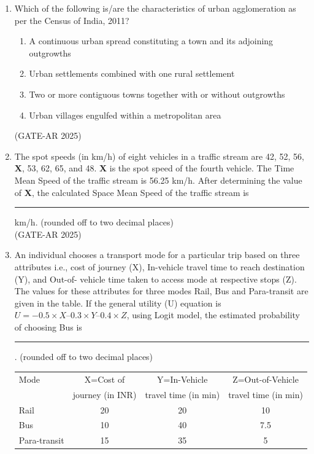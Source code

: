 \documentclass[a4paper,10pt]{article}
\begin{document}
\begin{enumerate}
\item Which of the following is/are the characteristics of urban agglomeration as per the Census of India, 2011?
\begin{enumerate}
    \item A continuous urban spread constituting a town and its adjoining outgrowths
    \item Urban settlements combined with one rural settlement
    \item Two or more contiguous towns together with or without outgrowths
    \item Urban villages engulfed within a metropolitan area
\end{enumerate}
\hfill (GATE-AR 2025)

    \item The spot speeds (in km/h) of eight vehicles in a traffic stream are 42, 52, 56, \textbf{X}, 53, 62, 65, and 48. \textbf{X} is the spot speed of the fourth vehicle. The Time Mean Speed of the traffic stream is 56.25 km/h. After determining the value of \textbf{X}, the calculated Space Mean Speed of the traffic stream is \rule{2cm}{0.4pt} km/h. (rounded off to two decimal places) \\
    \hfill (GATE-AR 2025)
    
    \item An individual chooses a transport mode for a particular trip based on three attributes
i.e., cost of journey (X), In-vehicle travel time to reach destination (Y), and Out-of-
vehicle time taken to access mode at respective stops (Z). The values for these
attributes for three modes Rail, Bus and Para-transit are given in the table. If the
general utility (U) equation is $U = - 0.5 \times X – 0.3 \times Y – 0.4 \times Z$, using Logit model, the estimated probability of choosing Bus is \rule{2cm}{0.4pt}. (rounded off to
two decimal places) \\
    \begin{tabular}{ |l|c|c|c|}
    \hline
    Mode & X=Cost of & Y=In-Vehicle & Z=Out-of-Vehicle \\
    & journey (in INR) & travel time (in min) & travel time (in min) \\
    \hline
    Rail & 20 & 20 & 10 \\
    \hline
    Bus & 10 & 40 & 7.5 \\
    \hline
    Para-transit & 15 & 35 & 5 \\
    \hline
    \end{tabular}


\end{enumerate}
\end{document}
